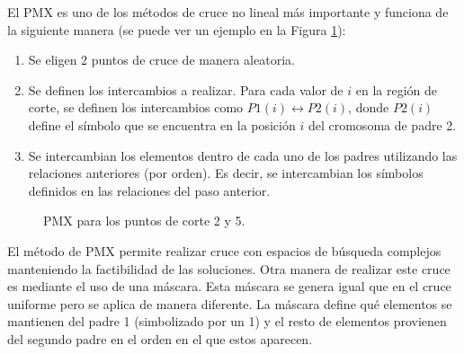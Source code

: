 El PMX es uno de los métodos de cruce no lineal más importante y funciona de la siguiente manera (se puede ver un ejemplo en la Figura \ref{fig:PMX}):
\begin{enumerate}
    \item Se eligen 2 puntos de cruce de manera aleatoria.
    \item Se definen los intercambios a realizar. Para cada valor de $i$ en la región de corte, se definen los intercambios como $P1(i)\leftrightarrow P2(i)$, donde $P2(i)$ define el símbolo que se encuentra en la posición $i$ del cromosoma de padre 2. 
    \item Se intercambian los elementos dentro de cada uno de los padres utilizando las relaciones anteriores (por orden). Es decir, se intercambian los símbolos definidos en las relaciones del paso anterior.
\end{enumerate}

\begin{figure}[t]
    \centering
    \caption{PMX para los puntos de corte 2 y 5.}
    \label{fig:PMX}
\end{figure}

El método de PMX permite realizar cruce con espacios de búsqueda complejos manteniendo la factibilidad de las soluciones. Otra manera de realizar este cruce es mediante el uso de una máscara. Esta máscara se genera igual que en el cruce uniforme pero se aplica de manera diferente. La máscara define qué elementos se mantienen del padre 1 (simbolizado por un 1) y el resto de elementos provienen del segundo padre en el orden en el que estos aparecen.\\

